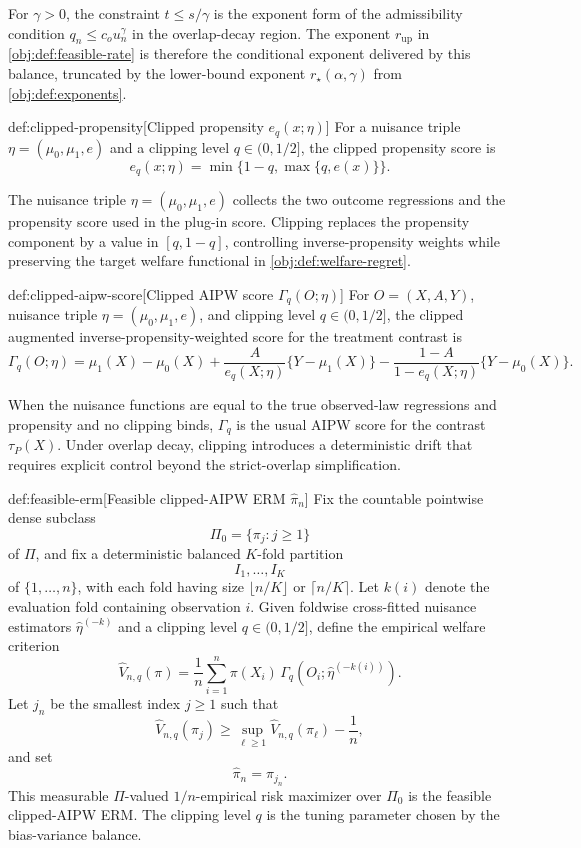 For \(\gamma>0\), the constraint \(t\le s/\gamma\) is the exponent form of the admissibility condition \(q_n\le c_o u_n^\gamma\) in the overlap-decay region.  The exponent \(r_{\mathrm{up}}\) in \cref{obj:def:feasible-rate} is therefore the conditional exponent delivered by this balance, truncated by the lower-bound exponent \(r_\star(\alpha,\gamma)\) from \cref{obj:def:exponents}.

\begin{definitionv}{def:clipped-propensity}[Clipped propensity $e_q(x;\eta)$]
For a nuisance triple \(\eta=(\mu_0,\mu_1,e)\) and a clipping level \(q\in(0,1/2]\), the clipped propensity score is
\[
e_q(x;\eta)
=
\min\{1-q,\max\{q,e(x)\}\}.
\]
\end{definitionv}

The nuisance triple \(\eta=(\mu_0,\mu_1,e)\) collects the two outcome regressions and the propensity score used in the plug-in score.  Clipping replaces the propensity component by a value in \([q,1-q]\), controlling inverse-propensity weights while preserving the target welfare functional in \cref{obj:def:welfare-regret}.

\begin{definitionv}{def:clipped-aipw-score}[Clipped AIPW score $\Gamma_q(O;\eta)$]
For \(O=(X,A,Y)\), nuisance triple \(\eta=(\mu_0,\mu_1,e)\), and clipping level \(q\in(0,1/2]\), the clipped augmented inverse-propensity-weighted score for the treatment contrast is
\[
\Gamma_q(O;\eta)
=
\mu_1(X)-\mu_0(X)
+
\frac{A}{e_q(X;\eta)}\{Y-\mu_1(X)\}
-
\frac{1-A}{1-e_q(X;\eta)}\{Y-\mu_0(X)\}.
\]
\end{definitionv}

When the nuisance functions are equal to the true observed-law regressions and propensity and no clipping binds, \(\Gamma_q\) is the usual AIPW score for the contrast \(\tau_P(X)\).  Under overlap decay, clipping introduces a deterministic drift that requires explicit control beyond the strict-overlap simplification.

\begin{definitionv}{def:feasible-erm}[Feasible clipped-AIPW ERM $\widehat\pi_n$]
Fix the countable pointwise dense subclass
\[
\Pi_0=\{\pi_j:j\ge 1\}
\]
of \(\Pi\), and fix a deterministic balanced \(K\)-fold partition
\[
I_1,\ldots,I_K
\]
of \(\{1,\ldots,n\}\), with each fold having size \(\lfloor n/K\rfloor\) or \(\lceil n/K\rceil\). Let \(k(i)\) denote the evaluation fold containing observation \(i\). Given foldwise cross-fitted nuisance estimators \(\widehat\eta^{(-k)}\) and a clipping level \(q\in(0,1/2]\), define the empirical welfare criterion
\[
\widehat V_{n,q}(\pi)
=
\frac1n\sum_{i=1}^n
\pi(X_i)\,
\Gamma_q\!\left(O_i;\widehat\eta^{(-k(i))}\right).
\]
Let \(j_n\) be the smallest index \(j\ge1\) such that
\[
\widehat V_{n,q}(\pi_j)
\ge
\sup_{\ell\ge1}\widehat V_{n,q}(\pi_\ell)-\frac1n,
\]
and set
\[
\widehat\pi_n=\pi_{j_n}.
\]
This measurable \(\Pi\)-valued \(1/n\)-empirical risk maximizer over \(\Pi_0\) is the feasible clipped-AIPW ERM. The clipping level \(q\) is the tuning parameter chosen by the bias-variance balance.
\end{definitionv}

